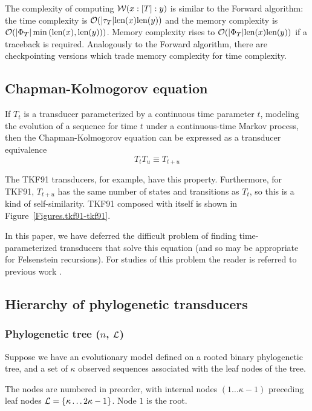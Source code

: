\documentclass{article}
\newcommand{\seclabel}[1]{\label{sec.#1}}
\newcommand{\figref}[1]{Figure~\ref{Figures.#1}}
\newcommand\wtrans[4]{#1(#2 : [#3] : #4)}
\newcommand\transequiv{\equiv}
\newcommand\compose{}
\newcommand\States{\Phi}
\newcommand\statesof[1]{\States_{#1}}
\newcommand\Transitions{\tau}
\newcommand\transitionsof[1]{\Transitions_{#1}}
\newcommand\weight{{\cal W}}
\newcommand\numberofstates[1]{|\statesof{#1}|}
\newcommand\numberoftransitions[1]{|\transitionsof{#1}|}
\newcommand\numberofleaves{\kappa}
\newcommand\numberofinternalnodes{\numberofleaves - 1}
\newcommand\numberofnodes{2\numberofleaves - 1}
\newcounter{LeafIndex}
\newcommand\leafnode[1]{\numberofleaves \ifthenelse{\equal{#1}{1}}{}{\setcounter{LeafIndex}{#1} \addtocounter{LeafIndex}{-1} +\arabic{LeafIndex}}}
\newcommand\leaves{{\cal L}}
\newcommand\seqlen[1]{\mbox{len}(#1)}
\newcommand\order[1]{{\cal O}(#1)}
\begin{document}
The complexity of computing $\wtrans{\weight}{x}{T}{y}$ is similar to the Forward algorithm:
the time complexity is $\order{\numberoftransitions{T} \seqlen{x} \seqlen{y}}$ and
the memory complexity is $\order{\numberofstates{T} \min\left(\seqlen{x},\seqlen{y}\right)}$.
Memory complexity rises to $\order{\numberofstates{T} \seqlen{x} \seqlen{y}}$ if a traceback is required.
Analogously to the Forward algorithm, there are checkpointing versions which trade memory complexity for time complexity.


\subsection{Chapman-Kolmogorov equation}
\seclabel{ChapmanKolmogorov}

If $T_t$ is a transducer parameterized by a continuous time parameter $t$,
modeling the evolution of a sequence for time $t$ under a continuous-time Markov process,
then the Chapman-Kolmogorov equation \cite{KarlinTaylor75} can be expressed as a transducer equivalence
\[
T_t \compose T_u \transequiv T_{t+u}
\]

The TKF91 transducers, for example, have this property.
Furthermore, for TKF91, $T_{t+u}$ has the same number of states and transitions as $T_t$,
so this is a kind of self-similarity.
TKF91 composed with itself is shown in \figref{tkf91-tkf91}. 

In this paper, we have deferred the difficult problem of finding time-parameterized transducers that solve this equation
(and so may be appropriate for Felsenstein recursions).
For studies of this problem the reader is referred to previous work \cite{ThorneEtal91,ThorneEtal92,KnudsenMiyamoto2003,MiklosLunterHolmes2004,Rivas05}.

\subsection{Hierarchy of phylogenetic transducers}
\seclabel{ModelStructure}
\subsubsection{Phylogenetic tree ($n$, $\leaves$)}
Suppose we have an evolutionary model defined on a rooted binary phylogenetic tree,
and a set of $\numberofleaves$ observed sequences associated with the leaf nodes of the tree.

The nodes are numbered in preorder, with internal nodes $(1 \ldots \numberofinternalnodes)$ preceding leaf nodes $\leaves = \{ \leafnode{1} \ldots \numberofnodes \}$. Node $1$ is the root.
\end{document}
